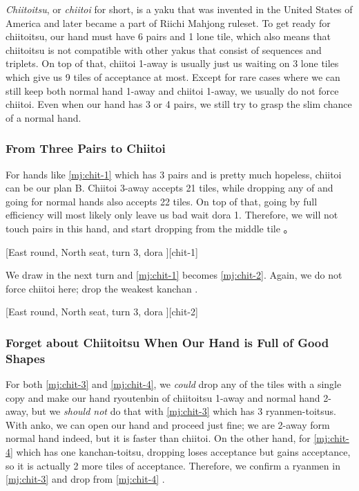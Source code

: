 \documentclass[12pt]{article}
\begin{document}
\textit{Chiitoitsu}, or \textit{chiitoi} for short, is a yaku that was invented in the United States of America and later became a part of Riichi Mahjong ruleset. To get ready for chiitoitsu, our hand must have 6 pairs and 1 lone tile, which also means that chiitoitsu is not compatible with other yakus that consist of sequences and triplets. On top of that, chiitoi 1-away is usually just us waiting on 3 lone tiles which give us 9 tiles of acceptance at most. Except for rare cases where we can still keep both normal hand 1-away and chiitoi 1-away, we usually do not force chiitoi. Even when our hand has 3 or 4 pairs, we still try to grasp the slim chance of a normal hand.


\subsubsection*{From Three Pairs to Chiitoi}

For hands like \ref{mj:chit-1} which has 3 pairs and is pretty much hopeless, chiitoi can be our plan B. Chiitoi 3-away accepts 21 tiles, while dropping any of  and going for normal hands also accepts  22 tiles. On top of that, going by full efficiency will most likely only leave us bad wait dora 1. Therefore, we will not touch pairs in this hand, and start dropping from the middle tile  \citep[][pp.~82--83]{zero-teyaku}。

[East round, North seat, turn 3, dora ][chit-1]

We draw  in the next turn and \ref{mj:chit-1} becomes \ref{mj:chit-2}. Again, we do not force chiitoi here; drop the weakest kanchan  \citep[][p.~83]{zero-teyaku}.

[East round, North seat, turn 3, dora ][chit-2]


\subsubsection*{Forget about Chiitoitsu When Our Hand is Full of Good Shapes}

For both \ref{mj:chit-3} and \ref{mj:chit-4}, we \textit{could} drop any of the tiles with a single copy and make our hand ryoutenbin of chiitoitsu 1-away and normal hand 2-away, but we \textit{should not} do that with \ref{mj:chit-3} which has 3 ryanmen-toitsus. With  anko, we can open our hand and proceed just fine; we are 2-away form normal hand indeed, but it is faster than chiitoi. On the other hand, for \ref{mj:chit-4} which has one kanchan-toitsu, dropping  loses  acceptance but gains  acceptance, so it is actually 2 more tiles of acceptance. Therefore, we confirm a ryanmen in \ref{mj:chit-3} and drop  from \ref{mj:chit-4} \citep[][p.~83]{zero-teyaku}.
\end{document}
